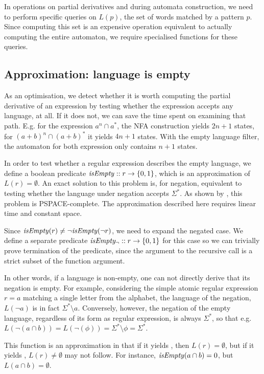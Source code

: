 In operations on partial derivatives and during automata construction, we need
to perform specific queries on $L(p)$, the set of words matched by a pattern
$p$. Since computing this set is an expensive operation equivalent to actually
computing the entire automaton, we require specialised functions for these
queries.


\subsection{Approximation: language is empty}

As an optimisation, we detect whether it is worth computing the partial
derivative of an expression by testing whether the expression accepts any
language, at all. If it does not, we can save the time spent on examining that
path. E.g. for the expression $a^n \cap a^*$, the NFA construction yields $2n +
1$ states, for $(a+b)^n \cap (a+b)^*$ it yields $4n + 1$ states. With the empty
language filter, the automaton for both expression only contains $n + 1$ states.

In order to test whether a regular expression describes the empty language, we
define a boolean predicate $\mathit{isEmpty} :: r \to \{0, 1\}$, which is an
approximation of $L(r) = \emptyset$. An exact solution to this problem is, for
negation, equivalent to testing whether the language under negation accepts
$\Sigma^*$. As shown by \cite{stoc73}, this problem is PSPACE-complete. The
approximation described here requires linear time and constant space.

Since $\mathit{isEmpty}(r) \neq \neg\mathit{isEmpty}(\neg r)$, we need to expand the negated
case. We define a separate predicate $\mathit{isEmpty_\neg} :: r \to \{0, 1\}$ for this
case so we can trivially prove termination of the predicate, since the argument
to the recursive call is a strict subset of the function argument.

In other words, if a language is non-empty, one can not directly derive that its
negation is empty. For example, considering the simple atomic regular expression
$r = a$ matching a single letter from the alphabet, the language of the
negation, $L(\neg a)$ is in fact $\Sigma^* \setminus a$. Conversely, however,
the negation of the empty language, regardless of its form as regular
expression, is always $\Sigma^*$, so that e.g. $L(\neg(a \cap b)) =
L(\neg(\phi)) = \Sigma^* \setminus \phi = \Sigma^*$.

This function is an approximation in that if it yields \true, then $L(r) =
\emptyset$, but if it yields \false, $L(r) \neq \emptyset$ may not follow. For
instance, $\mathit{isEmpty}(a \cap b) = 0$, but $L(a \cap b) = \emptyset$.

